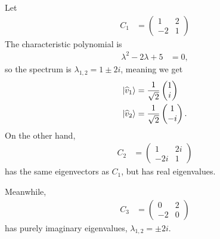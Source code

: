 \documentclass[10pt]{mypackage}
\begin{document}
\begin{example}
Let
\begin{align*}
  C_1 &= \begin{pmatrix}1 & 2 \\ -2 & 1\end{pmatrix}
\end{align*}
The characteristic polynomial is
\begin{align*}
  \lambda^2 -2\lambda + 5 &= 0,
\end{align*}
so the spectrum is $\lambda_{1,2} = 1 \pm 2i$, meaning we get
\begin{align*}
  \ket{\widehat{v}_1} &= \frac{1}{\sqrt{2}} \begin{pmatrix}1\\i\end{pmatrix}\\
  \ket{\widehat{v}_2} &= \frac{1}{\sqrt{2}} \begin{pmatrix}1\\-i\end{pmatrix}.
\end{align*}
On the other hand,
\begin{align*}
  C_2 &= \begin{pmatrix}1 & 2i \\ -2i & 1\end{pmatrix}
\end{align*}
has the same eigenvectors as $C_1$, but has real eigenvalues.\newline

Meanwhile,
\begin{align*}
  C_3 &= \begin{pmatrix}0 & 2 \\ -2 & 0\end{pmatrix}
\end{align*}
has purely imaginary eigenvalues, $\lambda_{1,2} = \pm 2i$.
\end{example}
\end{document}
